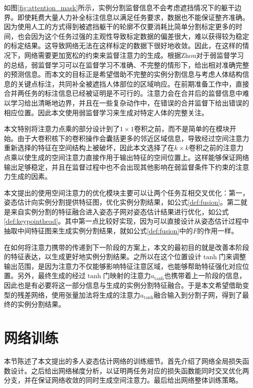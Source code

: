 如图\ref{fig:attention_mask}所示，实例分割监督信息不会考虑遮挡情况下的躯干边界。即使耗费大量人力补全标注信息以满足任务要求，数据也不能保证整齐准确。因为使用人工的方式得到被遮挡躯干的轮廓不仅要消耗比简单分割标定更多的时间，也会因为这个任务过强的主观性导致标定数据的偏差很大，难以获得较为稳定的标定结果。这导致网络无法在这样标定的数据下很好地收敛。因此，在这样的情况下，网络需要更加宽松的约束来监督注意力的生成。根据Zhou对于弱监督学习的总结\cite{10.1093/nsr/nwx106}，弱监督学习可以在监督学习不准确、不完整的情形下，给出相对准确完整的预测信息。而本文的目标正是希望借助不完整的实例分割信息与考虑人体结构信息的关键点标注，共同补全被遮挡人体部位的区域响应。在前期准备工作中，直接合并两任务的标注信息已经被证明是不可行的。注意力会在合并后的监督信息中难以学习给出清晰地边界，并且在一些复杂动作中，在错误的合并监督下给出错误的相应位置。因此本文使用弱监督学习来生成对特定人体的完整关注。

本文特别将注意力点乘的部分设计到了$1\times1$卷积之前，而不是简单的在模块开始。由于大卷积核下的卷积操作会囊括更多的邻近区域信息，导致经过空间注意力重新选择的特征在空间结构上被破坏，因此本文选择了在$k\times k$卷积之前的注意力点乘以使生成的空间注意力直接作用于输出特征的空间位置上。这样能够保证网络输出足够稳定，并且在监督过程中也不会出现其他影响在弱监督条件下约束的注意力生成的因素。

本文提出的使用空间注意力的优化模块主要可以让两个任务互相交叉优化：第一，姿态估计向实例分割提供特征图，优化实例分割结果，如公式\eqref{def:fusion}。第二就是来自实例分割的特征融合进入姿态子网对姿态估计结果进行优化，如公式\eqref{def:keypointhead}。其中第一点比较好实现，因为可以直接设计从姿态估计过程中抽取中间特征图来生成实例分割结果，就如公式\eqref{def:fusion}中的$F$的作用一样。

在如何将注意力携带的传递到下一阶段的方案上，本文的最初目的就是改善本阶段的特征表达，以生成更好地实例分割结果。之所以在这个位置设计$\tanh$门来调整输出范围，是因为注意力不仅能够影响特征注意区域，也能够帮助特征强化对应位置。另外，最终生成的经过$\tanh$门映射的注意力$a_{\tanh}$也携带着上一阶段的信息，因此也是有必要将这一部分信息与生成的实例分割特征融合。于是本文希望借助变型的残差网络，使用张量加法将生成的注意力$a_{\tanh}$融合输入到分割子网，得到了最终的实例分割结果。


\section{网络训练}
\label{sec:training}
本节陈述了本文提出的多人姿态估计网络的训练细节。首先介绍了网络全局损失函数设计。之后给出网络梯度分析，以证明两任务对应的损失函数能同时交叉优化两分支，并在保证网络收敛的同时生成空间注意力。最后给出网络整体训练策略。
